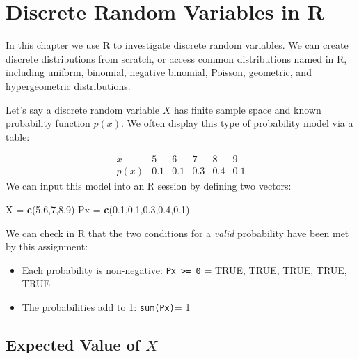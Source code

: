\documentclass[
]{book}
\newenvironment{Shaded}{\begin{snugshade}}{\end{snugshade}}
\newcommand{\DecValTok}[1]{\textcolor[rgb]{0.00,0.00,0.81}{#1}}
\newcommand{\FloatTok}[1]{\textcolor[rgb]{0.00,0.00,0.81}{#1}}
\newcommand{\FunctionTok}[1]{\textcolor[rgb]{0.13,0.29,0.53}{\textbf{#1}}}
\newcommand{\NormalTok}[1]{#1}
\newcommand{\OtherTok}[1]{\textcolor[rgb]{0.56,0.35,0.01}{#1}}
\providecommand{\tightlist}{%
  \setlength{\itemsep}{0pt}\setlength{\parskip}{0pt}}
\theoremstyle{definition}
\theoremstyle{definition}
\theoremstyle{definition}
\theoremstyle{definition}
\theoremstyle{remark}
\begin{document}
\chapter{Discrete Random Variables in R}\label{R-discreteRV}

In this chapter we use R to investigate discrete random variables. We can create discrete distributions from scratch, or access common distributions named in R, including uniform, binomial, negative binomial, Poisson, geometric, and hypergeometric distributions.

Let's say a discrete random variable \(X\) has finite sample space and known probability function \(p(x)\). We often display this type of probability model via a table:

\[
\begin{array}{c|c|c|c|c|c}
x & 5 & 6 & 7 & 8 & 9 \\ \hline
p(x) & 0.1 & 0.1 & 0.3 & 0.4 & 0.1 
\end{array}
\]
We can input this model into an R session by defining two vectors:

\begin{Shaded}
\begin{Highlighting}[]
\NormalTok{X }\OtherTok{=} \FunctionTok{c}\NormalTok{(}\DecValTok{5}\NormalTok{,}\DecValTok{6}\NormalTok{,}\DecValTok{7}\NormalTok{,}\DecValTok{8}\NormalTok{,}\DecValTok{9}\NormalTok{)}
\NormalTok{Px }\OtherTok{=} \FunctionTok{c}\NormalTok{(}\FloatTok{0.1}\NormalTok{,}\FloatTok{0.1}\NormalTok{,}\FloatTok{0.3}\NormalTok{,}\FloatTok{0.4}\NormalTok{,}\FloatTok{0.1}\NormalTok{)}
\end{Highlighting}
\end{Shaded}

We can check in R that the two conditions for a \emph{valid} probability have been met by this assignment:

\begin{itemize}
\tightlist
\item
  Each probability is non-negative: \texttt{Px\ \textgreater{}=\ 0} = TRUE, TRUE, TRUE, TRUE, TRUE
\item
  The probabilities add to 1: \texttt{sum(Px)}= 1
\end{itemize}

\section{\texorpdfstring{Expected Value of \(X\)}{Expected Value of X}}\label{expected-value-of-x}
\end{document}
